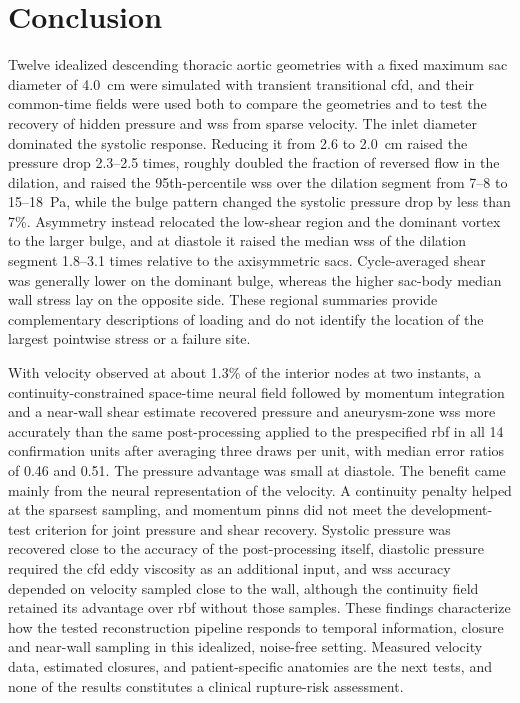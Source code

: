 \documentclass[12pt,a4paper]{article}
\newcommand{\cfdrevision}[1]{#1} %
\newcommand{\CFD}{\ac{cfd}\xspace}
\newcommand{\PINNs}{\acp{pinn}\xspace}
\newcommand{\WSS}{\ac{wss}\xspace}
\newcommand{\TAWSS}{\ac{tawss}\xspace}
\newcommand{\RBF}{\ac{rbf}\xspace}
\theoremstyle{definition}
\numberwithin{equation}{section}
\providecommand{\DIFaddtex}[1]{{\protect\color{blue} \sf #1}} %
\providecommand{\DIFdeltex}[1]{{\protect\color{red} \scriptsize #1}} %
\providecommand{\DIFaddbegin}{} %
\providecommand{\DIFaddend}{} %
\providecommand{\DIFdelbegin}{} %
\providecommand{\DIFdelend}{} %
\providecommand{\DIFadd}[1]{\texorpdfstring{\DIFaddtex{#1}}{#1}} %
\providecommand{\DIFdel}[1]{\texorpdfstring{\DIFdeltex{#1}}{}} %
\newcommand{\DIFscaledelfig}{0.5}
\newlength{\DIFdelgraphicswidth} %
\newlength{\DIFdelgraphicsheight} %
\newcommand{\DIFaddincludegraphics}[2][]{{\color{blue}\fbox{\DIFOincludegraphics[#1]{#2}}}} %
\newcommand{\DIFdelincludegraphics}[2][]{%
\sbox{\DIFdelgraphicsbox}{\DIFOincludegraphics[#1]{#2}}%
\settoboxwidth{\DIFdelgraphicswidth}{\DIFdelgraphicsbox} %
\settoboxtotalheight{\DIFdelgraphicsheight}{\DIFdelgraphicsbox} %
\scalebox{\DIFscaledelfig}{%
\parbox[b]{\DIFdelgraphicswidth}{\usebox{\DIFdelgraphicsbox}\\[-\baselineskip] \rule{\DIFdelgraphicswidth}{0em}}\llap{\resizebox{\DIFdelgraphicswidth}{\DIFdelgraphicsheight}{%
\setlength{\unitlength}{\DIFdelgraphicswidth}%
\begin{picture}(1,1)%
\thicklines\linethickness{2pt} %
{\color[rgb]{1,0,0}\put(0,0){\framebox(1,1){}}}%
{\color[rgb]{1,0,0}\put(0,0){\line( 1,1){1}}}%
{\color[rgb]{1,0,0}\put(0,1){\line(1,-1){1}}}%
\end{picture}%
}\hspace*{3pt}}} %
} %
\DeclareRobustCommand{\DIFaddbegin}{\DIFOaddbegin \let\includegraphics\DIFaddincludegraphics} %
\DeclareRobustCommand{\DIFaddend}{\DIFOaddend \let\includegraphics\DIFOincludegraphics} %
\DeclareRobustCommand{\DIFdelbegin}{\DIFOdelbegin \let\includegraphics\DIFdelincludegraphics} %
\DeclareRobustCommand{\DIFdelend}{\DIFOaddend \let\includegraphics\DIFOincludegraphics} %
\renewcommand{\DIFaddtex}[1]{{\protect\color{red}#1}}
\renewcommand{\DIFdeltex}[1]{}
\renewcommand{\DIFdel}[1]{}
\renewcommand{\DIFaddincludegraphics}[2][]{\DIFOincludegraphics[#1]{#2}}
\renewcommand{\DIFdelincludegraphics}[2][]{}
\renewcommand{\cfdrevision}[1]{\textcolor{red}{#1}}
\def\DIFaddbegin{}\def\DIFaddend{}%
\def\DIFdelbegin{}\def\DIFdelend{}%
\def\cfdrevision#1{#1}%
\begin{document}
\section{Conclusion}
\label{sec:conclusion}
Twelve idealized descending thoracic aortic geometries with a fixed maximum sac diameter of 4.0~cm were simulated with transient transitional \CFD, and their common-time fields were used both to compare the geometries and to test the recovery of hidden pressure and \WSS from sparse velocity. The inlet diameter dominated the systolic response. Reducing it from 2.6 to 2.0~cm raised the pressure drop 2.3--2.5 times, roughly doubled the fraction of reversed flow in the dilation, and raised the 95th-percentile \WSS over the dilation segment from 7--8 to 15--18~Pa, while the bulge pattern changed the systolic pressure drop by less than 7\%. Asymmetry instead relocated the low-shear region and the dominant vortex to the larger bulge, and at diastole it raised the median \WSS of the dilation segment 1.8--3.1 times relative to the axisymmetric sacs. \DIFdelbegin \DIFdel{The same redistribution appeared in the cycle average, with the lowest }%
\DIFdel{on the dominant bulge, whereas the highest modeled wall stress lay on the wall opposite it, contrary to the Laplace-law expectation; the hemodynamic and structural markers therefore identify different walls of the same sac.
}\DIFdelend \DIFaddbegin \DIFadd{\cfdrevision{Cycle-averaged shear was generally lower on the dominant bulge, whereas the higher sac-body median wall stress lay on the opposite side. These regional summaries provide complementary descriptions of loading and do not identify the location of the largest pointwise stress or a failure site.}
}\DIFaddend 

With velocity observed at about 1.3\% of the interior nodes at two instants, a continuity-constrained space-time neural field followed by momentum integration and a near-wall shear estimate recovered pressure and aneurysm-zone \WSS more accurately than the same post-processing applied to the prespecified \RBF in all 14 confirmation units after averaging three draws per unit, with median error ratios of 0.46 and 0.51. The pressure advantage was small at diastole. The benefit came mainly from the neural representation of the velocity. A continuity penalty helped at the sparsest sampling, and momentum \PINNs did not meet the development-test criterion for joint pressure and shear recovery. Systolic pressure was recovered close to the accuracy of the post-processing itself, diastolic pressure required the \CFD eddy viscosity as an additional input, and \WSS accuracy depended on velocity sampled close to the wall, although the continuity field retained its advantage over \RBF without those samples. These findings \DIFdelbegin \DIFdel{identify what informationeach hidden field needs }\DIFdelend \DIFaddbegin \DIFadd{characterize how the tested reconstruction pipeline responds to temporal information, closure and near-wall sampling }\DIFaddend in this idealized, noise-free setting. Measured velocity data, estimated closures, and patient-specific anatomies are the next tests, and none of the results constitutes a clinical rupture-risk assessment.
\end{document}
